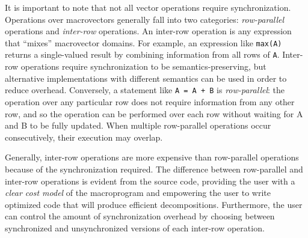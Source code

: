 It is important to note that not all vector operations require
synchronization.  Operations over macrovectors generally fall into two
categories: {\em row-parallel} operations and {\em inter-row}
operations.  An inter-row operation is any expression that ``mixes''
macrovector domains. For example, an expression like {\tt max(A)}
returns a single-valued result by combining information from all rows
of {\tt A}. Inter-row operations require synchronization to be
semantics-preserving, but alternative implementations with different
semantics can be used in order to reduce overhead.  Conversely, a
statement like {\tt A = A + B} is {\em row-parallel}: the operation
over any particular row does not require information from any other
row, and so the operation can be performed over each row without
waiting for A and B to be fully updated.  When multiple row-parallel
operations occur consecutively, their execution may overlap.

Generally, inter-row operations are more expensive than row-parallel
operations because of the synchronization required.  The difference
between row-parallel and inter-row operations is evident from the
source code, providing the user with a {\em clear cost model} of the
macroprogram and empowering the user to write optimized code
that will produce efficient decompositions.  Furthermore, the
user can control the amount of synchronization overhead by
choosing between synchronized and unsynchronized versions of each
inter-row operation.






